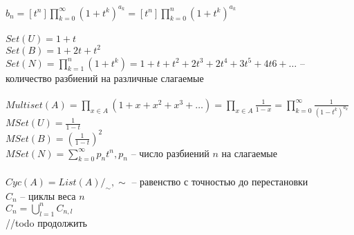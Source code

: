 \documentclass[12pt]{article}
\begin{document}
$b_n = [t^n] \prod_{k=0}^\infty (1+t^k)^{a_k} = [t^n]\prod_{k=0}^n (1+t^k)^{a_k}$\\\\
$Set(U) = 1 + t$\\
$Set(B) = 1 + 2t + t^2$\\
$Set(N) = \prod_{k=1}^n (1+t^k) = 1 + t + t^2 + 2t^3 + 2t^4 + 3t^5 + 4t6+ \ldots$ -- количество разбиений на различные слагаемые\\\\
$Multiset(A) = \prod_{x\in A} (1+x+x^2+x^3 + \ldots) = \prod_{x\in A} \frac1{1-x} = \prod_{k=0}^\infty \frac{1}{(1-t^k)^{a_k}}$\\
$MSet(U) = \frac{1}{1-t}$\\
$MSet(B) = (\frac1{1-t})^2$\\
$MSet(N) = \sum_{k=0}^\infty p_nt^n, p_n$ -- число разбиений $n$ на слагаемые\\\\
$Cyc(A) = List(A) /_{\sim}, \sim$ -- равенство с точностью до перестановки\\
$C_n$ -- циклы веса $n$\\
$C_n = \bigcup_{l=1}^n C_{n,l}$\\
//todo продолжить
\end{document}
